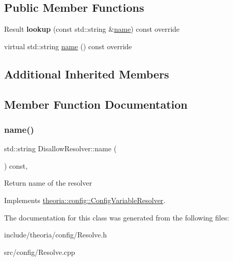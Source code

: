 \subsection*{Public Member Functions}
\begin{DoxyCompactItemize}
\item 
\mbox{\label{classtheoria_1_1config_1_1DisallowResolver_a70db68fce5348edea51d7303f2bb3f33}} 
Result {\bfseries lookup} (const std\+::string \&\hyperlink{classtheoria_1_1config_1_1DisallowResolver_a8352df79f9e0f17fbfad8801bfdcc99e}{name}) const override
\item 
virtual std\+::string \hyperlink{classtheoria_1_1config_1_1DisallowResolver_a8352df79f9e0f17fbfad8801bfdcc99e}{name} () const override
\end{DoxyCompactItemize}
\subsection*{Additional Inherited Members}


\subsection{Member Function Documentation}
\mbox{\label{classtheoria_1_1config_1_1DisallowResolver_a8352df79f9e0f17fbfad8801bfdcc99e}} 
\subsubsection{\texorpdfstring{name()}{name()}}
{\footnotesize\ttfamily std\+::string Disallow\+Resolver\+::name (\begin{DoxyParamCaption}{ }\end{DoxyParamCaption}) const\hspace{0.3cm}{\ttfamily [override]}, {\ttfamily [virtual]}}

Return name of the resolver 

Implements \hyperlink{classtheoria_1_1config_1_1ConfigVariableResolver_a026bda729faf988eaef334a45ec92303}{theoria\+::config\+::\+Config\+Variable\+Resolver}.



The documentation for this class was generated from the following files\+:\begin{DoxyCompactItemize}
\item 
include/theoria/config/Resolve.\+h\item 
src/config/Resolve.\+cpp\end{DoxyCompactItemize}
